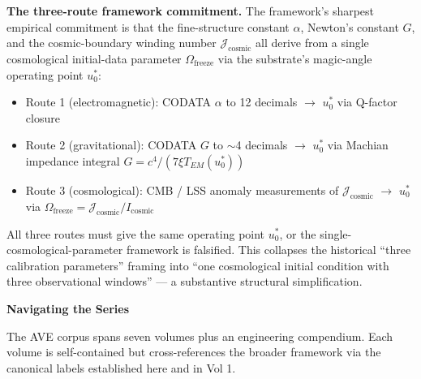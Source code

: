 \noindent \textbf{The three-route framework commitment.} The framework's sharpest empirical commitment is that the fine-structure constant $\alpha$, Newton's constant $G$, and the cosmic-boundary winding number $\mathcal{J}_{\text{cosmic}}$ all derive from a single cosmological initial-data parameter $\Omega_{\text{freeze}}$ via the substrate's magic-angle operating point $u_0^*$:

\begin{itemize}\itemsep 0pt
    \item Route 1 (electromagnetic): CODATA $\alpha$ to 12 decimals $\to$ $u_0^*$ via Q-factor closure
    \item Route 2 (gravitational): CODATA $G$ to $\sim$4 decimals $\to$ $u_0^*$ via Machian impedance integral $G = c^4 / (7\xi T_{EM}(u_0^*))$
    \item Route 3 (cosmological): CMB / LSS anomaly measurements of $\mathcal{J}_{\text{cosmic}}$ $\to$ $u_0^*$ via $\Omega_{\text{freeze}} = \mathcal{J}_{\text{cosmic}} / I_{\text{cosmic}}$
\end{itemize}

\noindent All three routes must give the same operating point $u_0^*$, or the single-cosmological-parameter framework is falsified. This collapses the historical ``three calibration parameters'' framing into ``one cosmological initial condition with three observational windows'' --- a substantive structural simplification.

\vspace{1.5em}
\noindent \textbf{Navigating the Series}

\noindent The AVE corpus spans seven volumes plus an engineering compendium. Each volume is self-contained but cross-references the broader framework via the canonical labels established here and in Vol 1.

